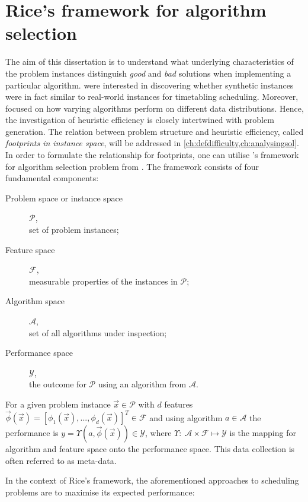 \section{Rice's framework for algorithm selection}\label{sec:rice}
The aim of this dissertation is to understand what underlying characteristics 
of the problem instances distinguish \emph{good} and \emph{bad} solutions 
when implementing a particular algorithm. \citet{SmithMilesLion5} were 
interested in discovering whether synthetic instances were in fact similar to 
real-world instances for timetabling scheduling. Moreover,  
\citeauthor{SmithMilesLion5} focused on how varying algorithms perform 
on different data distributions. Hence, the investigation of heuristic 
efficiency is closely intertwined with problem generation. 
The relation between problem structure and heuristic efficiency, called 
\emph{footprints in instance space}, will be addressed in 
\cref{ch:defdifficulty,ch:analysingsol}.
In order to formulate the relationship for footprints, one can utilise 
\citeauthor{Rice76}'s framework for algorithm selection problem 
from \citeyear{Rice76}. The framework consists of four fundamental components:
\begin{description}
	\item[Problem space or instance space] $\mathcal{P}$, \hfill\\
	set of problem instances; 
	\item[Feature space] $\mathcal{F}$, \hfill\\
	measurable properties of the instances in $\mathcal{P}$;
	\item[Algorithm space] $\mathcal{A}$, \hfill\\
	set of all algorithms under inspection;
	\item[Performance space] $\mathcal{Y}$, \hfill\\
	the outcome for $\mathcal{P}$ using an algorithm from $\mathcal{A}$.
\end{description}
For a given problem instance $\vec{x}\in\mathcal{P}$ with $d$ features 
$\vec{\phi}(\vec{x})=\left[\phi_1(\vec{x}),...,\phi_d( 
\vec{x})\right]^T\in\mathcal{F}$ and using algorithm $a\in\mathcal{A}$ the 
performance is $y=\Upsilon(a,\vec{\phi}(\vec{x}))\in\mathcal{Y}$, where 
$\Upsilon:\;\mathcal{A}\times\mathcal{F} \mapsto \mathcal{Y}$ is the mapping 
for algorithm and feature space onto the performance space. This data 
collection is often referred to as meta-data. 

In the context of Rice's framework, the aforementioned approaches to scheduling problems are to maximise its expected performance: 

